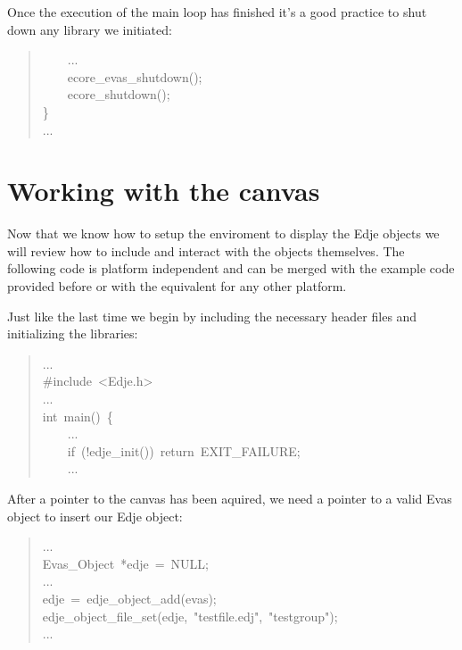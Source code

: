 \documentclass[12pt,a4paper,english]{book}
\begin{document}
Once the execution of the main loop has finished it's a good practice to shut
down any library we initiated:
\begin{quote}{\ttfamily \raggedright \noindent
~~~~...~\\
~~~~ecore{\_}evas{\_}shutdown();~\\
~~~~ecore{\_}shutdown();~\\
{\}}~\\
...
}\end{quote}



\hypertarget{working-with-the-canvas}{}
\section{Working with the canvas}
\label{working-with-the-canvas}

Now that we know how to setup the enviroment to display the Edje objects we
will review how to include and interact with the objects themselves. The
following code is platform independent and can be merged with the example code
provided before or with the equivalent for any other platform.

Just like the last time we begin by including the necessary header files and
initializing the libraries:
\begin{quote}{\ttfamily \raggedright \noindent
...~\\
{\#}include~<Edje.h>~\\
...~\\
int~main()~{\{}~\\
~~~~...~\\
~~~~if~(!edje{\_}init())~return~EXIT{\_}FAILURE;~\\
~~~~...
}\end{quote}

After a pointer to the canvas has been aquired, we need a pointer to a valid
Evas object to insert our Edje object:
\begin{quote}{\ttfamily \raggedright \noindent
...~\\
Evas{\_}Object~*edje~=~NULL;~\\
...~\\
edje~=~edje{\_}object{\_}add(evas);~\\
edje{\_}object{\_}file{\_}set(edje,~"testfile.edj",~"testgroup");~\\
...
}\end{quote}
\end{document}
